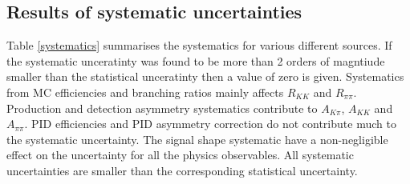 \subsection{Results of systematic uncertainties}

Table \ref{systematics} summarises the systematics for various different sources. If the systematic unceratinty was found to be more than 2 orders of magntiude smaller than the statistical unceratinty then a value of zero is given. Systematics from MC efficiencies and branching ratios mainly affects $R_{KK}$ and $R_{\pi\pi}$. Production and detection asymmetry systematics contribute to $A_{K\pi}$, $A_{KK}$ and $A_{\pi\pi}$. PID efficiencies and PID asymmetry correction do not contribute much to the systematic uncertainty. The signal shape systematic have a non-negligible effect on the uncertainty for all the physics observables. All systematic uncertainties are smaller than the corresponding statistical uncertainty. 

